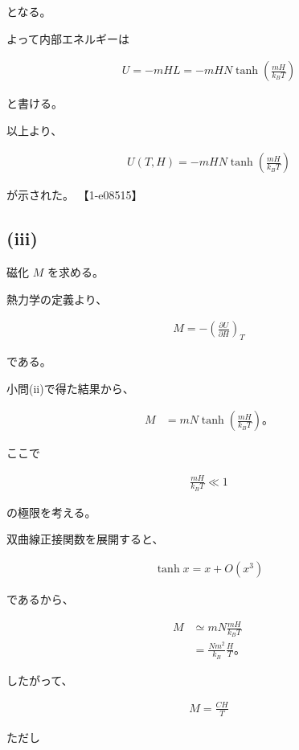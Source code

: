 \documentclass[platex,dvipdfmx,a4paper]{jsarticle}
\begin{document}
となる。

よって内部エネルギーは

\begin{align*}
U
=
-mHL
=
-mHN
\tanh
\left(
\frac{mH}{k_BT}
\right)
\end{align*}

と書ける。

以上より、

\begin{align*}
U(T,H)
=
-mHN
\tanh
\left(
\frac{mH}{k_BT}
\right)
\end{align*}

が示された。 【1-e08515】

\subsection{(iii)}

磁化 $M$ を求める。

熱力学の定義より、

\begin{align*}
M
=
-\left(
\frac{\partial U}{\partial H}
\right)_T
\end{align*}

である。

小問(ii)で得た結果から、

\begin{align*}
M
&=
mN
\tanh
\left(
\frac{mH}{k_BT}
\right)。
\end{align*}

ここで

\begin{align*}
\frac{mH}{k_BT}
\ll
1
\end{align*}

の極限を考える。

双曲線正接関数を展開すると、

\begin{align*}
\tanh x
=
x+O(x^3)
\end{align*}

であるから、

\begin{align*}
M
&\simeq
mN
\frac{mH}{k_BT}
\\
&=
\frac{Nm^2}{k_B}
\frac{H}{T}。
\end{align*}

したがって、

\begin{align*}
M
=
\frac{CH}{T}
\end{align*}

ただし
\end{document}
